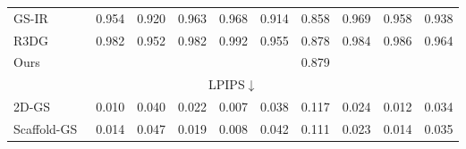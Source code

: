 \begin{table*}
{\begin{tabular}{lccccccccc}
GS-IR~\cite{liang2024gs} & 0.954 & 0.920 & 0.963 & 0.968 & 0.914 & 0.858 & 0.969 & 0.958   & 0.938     \\

R3DG~\cite{gao2023relightable}    &  \cellcolor{yzythird}0.982            & \cellcolor{yzysecond}0.952       & \cellcolor{yzybest}0.982                 &  \cellcolor{yzybest}0.992                  &   \cellcolor{yzythird}0.955                      &  0.878                   &    \cellcolor{yzysecond}0.984               &   \cellcolor{yzysecond}0.986  &  0.964                                                                                                                                                                                                                                                                     \\

Ours & \cellcolor{yzybest}{0.988}                          & \cellcolor{yzybest}{0.953}              & \cellcolor{yzybest}{0.982}                         & \cellcolor{yzysecond}{0.991}                        & \cellcolor{yzysecond}{0.956}             & {0.879}                       & \cellcolor{yzybest}{0.985}                           & \cellcolor{yzybest}{0.987}  &  \cellcolor{yzythird}{0.965}              
 \\ \hline
 




\multicolumn{10}{c}{LPIPS$\downarrow$}                                                                                                                                                                                                                                              \\ \hline
2D-GS~\cite{Huang2DGS2024}        & \cellcolor{yzybest}0.010                     & \cellcolor{yzysecond}0.040                     & 0.022                   & \cellcolor{yzysecond}0.007                   & \cellcolor{yzythird}0.038                         & \cellcolor{yzythird}0.117                    & 0.024                      & \cellcolor{yzysecond}0.012  &  \cellcolor{yzythird}0.034                          \\

Scaffold-GS~\cite{lu2024scaffold}      & \cellcolor{yzythird}0.014                     & 0.047                     & \cellcolor{yzythird}0.019                 & \cellcolor{yzythird}0.008                  & 0.042                         & \cellcolor{yzybest}0.111                    & \cellcolor{yzythird}0.023                     & 0.014 & 0.035                  \\


\end{tabular}}
\end{table*}
